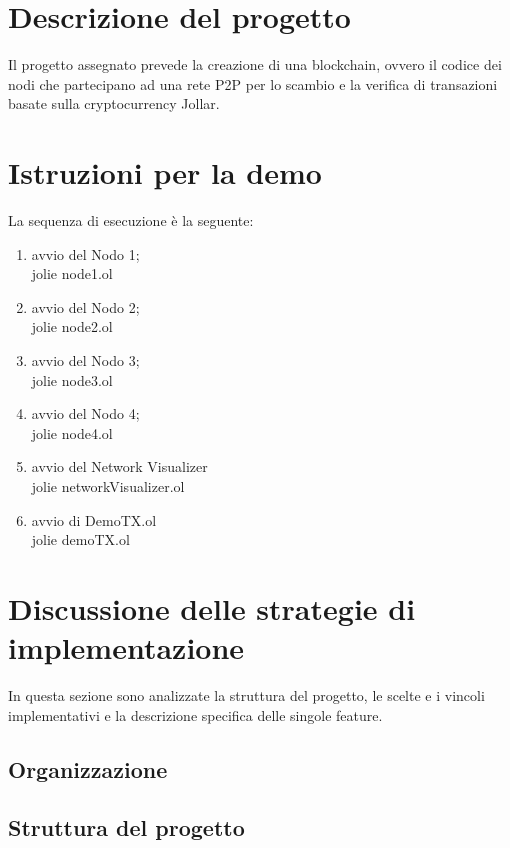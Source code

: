 \documentclass[12pt,a4paper]{article}
\begin{document}
\section{Descrizione del progetto}
Il progetto assegnato prevede la creazione di una blockchain, ovvero il codice dei nodi che partecipano ad una rete P2P per lo scambio e la verifica di transazioni basate sulla cryptocurrency Jollar. 
\newpage
\section{Istruzioni per la demo}
La sequenza di esecuzione è la seguente:
\begin{enumerate}
    \item avvio del Nodo 1;\\
    jolie node1.ol
    \item avvio del Nodo 2;\\
    jolie node2.ol
    \item avvio del Nodo 3;\\
    jolie node3.ol
    \item avvio del Nodo 4;\\
    jolie node4.ol
    \item avvio del Network Visualizer \\
    jolie networkVisualizer.ol
    \item avvio di DemoTX.ol\\
    jolie demoTX.ol
\end{enumerate}
\newpage
\section{Discussione delle strategie di implementazione}
In questa sezione sono analizzate la struttura del progetto, le scelte e i vincoli implementativi e la descrizione specifica delle singole feature.
\subsection{Organizzazione}

\subsection{Struttura del progetto}
\end{document}
